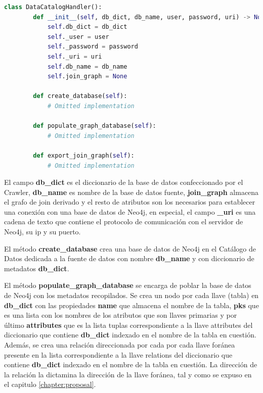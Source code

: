 \begin{lstlisting}[label={code:catalog}, caption={Clase DataCatalogHandler}, language={python}]
    class DataCatalogHandler():
        def __init__(self, db_dict, db_name, user, password, uri) -> None:
            self.db_dict = db_dict
            self._user = user
            self._password = password
            self._uri = uri
            self.db_name = db_name
            self.join_graph = None

        def create_database(self):
            # Omitted implementation

        def populate_graph_database(self):
            # Omitted implementation

        def export_join_graph(self):
            # Omitted implementation

\end{lstlisting}

El campo \textbf{db\_dict} es el diccionario de la base de datos confeccionado por el Crawler, \textbf{db\_name} es 
nombre de la base de datos fuente, \textbf{join\_graph} almacena el grafo de join derivado y el resto de atributos 
son los necesarios para establecer una conexi\'on con una base de datos de Neo4j, en especial, el campo \textbf{\_uri} 
es una cadena de texto que contiene el protocolo de comunicaci\'on con el servidor de Neo4j, su ip y su puerto. 

El m\'etodo \textbf{create\_database} crea una base de datos de Neo4j en el Cat\'alogo de Datos dedicada a la 
fuente de datos con nombre \textbf{db\_name} y con diccionario de metadatos \textbf{db\_dict}. 

El m\'etodo \textbf{populate\_graph\_database} se encarga de poblar la base de datos de Neo4j con los metadatos
recopilados. Se crea 
un nodo por cada llave (tabla) 
en \textbf{db\_dict} con las propiedades \textbf{name} que almacena el nombre de la tabla, \textbf{pks} que es una 
lista con los nombres de los atributos que son llaves primarias y por \'ultimo \textbf{attributes} que 
es la lista tuplas correspondiente a la llave attributes del diccionario que contiene \textbf{db\_dict} 
indexado en el nombre de la tabla en cuesti\'on. Adem\'as, se crea una relación direccionada por cada por cada llave for\'anea 
presente en la lista correspondiente a la llave relations del diccionario que contiene \textbf{db\_dict} 
indexado en el nombre de la tabla en cuesti\'on. La direcci\'on de la relación la dictamina la direcci\'on de la llave 
for\'anea, tal y como se expuso en el capitulo \ref{chapter:proposal}.

